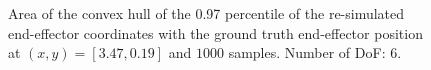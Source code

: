 \documentclass[conference]{IEEEtran}
\begin{document}
\begin{figure}[tbh]
\centering

    \caption{\label{fig:q_quantile:cVAE:6dof} Area of the convex hull of the 0.97 percentile of the re-simulated end-effector coordinates with the ground truth end-effector position at $(x, y) = [3.47, 0.19]$ and $1000$ samples. Number of DoF: 6.}
\end{figure}
\end{document}

